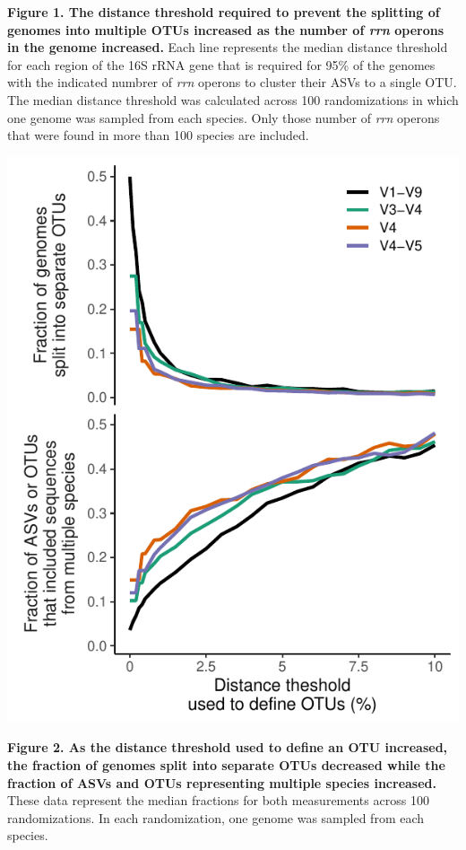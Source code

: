 \documentclass[
]{article}
\begin{document}
\textbf{Figure 1. The distance threshold required to prevent the
splitting of genomes into multiple OTUs increased as the number of
\emph{rrn} operons in the genome increased.} Each line represents the
median distance threshold for each region of the 16S rRNA gene that is
required for 95\% of the genomes with the indicated numbrer of
\emph{rrn} operons to cluster their ASVs to a single OTU. The median
distance threshold was calculated across 100 randomizations in which one
genome was sampled from each species. Only those number of \emph{rrn}
operons that were found in more than 100 species are included.

\newpage

\includegraphics{../figures/lump_split.pdf}

\textbf{Figure 2. As the distance threshold used to define an OTU
increased, the fraction of genomes split into separate OTUs decreased
while the fraction of ASVs and OTUs representing multiple species
increased.} These data represent the median fractions for both
measurements across 100 randomizations. In each randomization, one
genome was sampled from each species.
\end{document}
